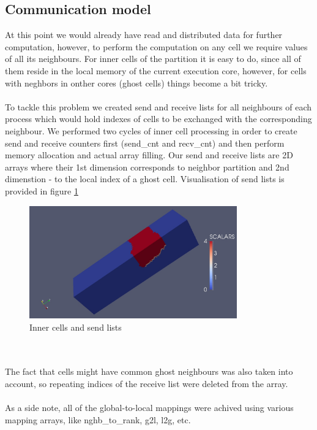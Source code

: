 \documentclass{article}
\begin{document}
\subsection{Communication model}
At this point we would already have read and distributed data for further computation, however, to perform the computation on any cell we require values of all its neighbours. For inner cells of the partition it is easy to do, since all of them reside in the local memory of the current execution core, however, for cells with neghbors in onther cores (ghost cells) things become a bit tricky.
\\\\
To tackle this problem we created send and receive lists for all neighbours of each process which would hold indexes of cells to be exchanged with the corresponding neighbour. We performed two cycles of inner cell processing in order to create send and receive counters first (send\_cnt and recv\_cnt) and then perform memory allocation and actual array filling. Our send and receive lists are 2D arrays where their 1st dimension corresponds to neighbor partition and 2nd dimenstion - to the local index of a ghost cell. Visualisation of send lists is provided in figure \ref{fig:6}
\begin{figure}[h!]
	\begin{center}
		\includegraphics[width=0.8\textwidth]{send-listst.jpg}
		\caption{Inner cells and send lists}
		\label{fig:6}
	\end{center}
\end{figure}
\\\\
The fact that cells might have common ghost neighbours was also taken into account, so repeating indices of the receive list were deleted from the array.
\\\\
As a side note, all of the global-to-local mappings were achived using various mapping arrays, like nghb\_to\_rank, g2l, l2g, etc.
\end{document}
